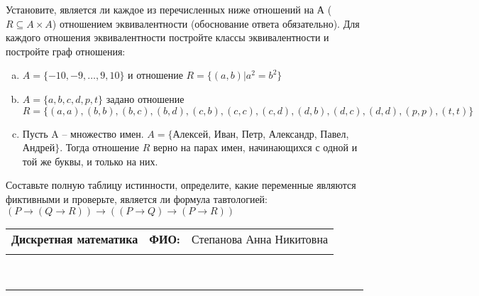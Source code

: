 \documentclass[10pt]{exam}
\newcommand{\class}{Дискретная математика}
\newcommand{\examdate}{}
\begin{document}
\begin{questions}
\question
Установите, является ли каждое из перечисленных ниже отношений на А ($R \subseteq A \times A$) отношением эквивалентности (обоснование ответа обязательно). Для каждого отношения эквивалентности постройте классы 
эквивалентности и постройте граф отношения:
\begin{enumerate} [a)]\setcounter{enumi}{0}
\item $A = \{-10, -9, … , 9, 10\}$ и отношение $R = \{(a,b)|a^{2} = b^{2}\}$
\item $A = \{a, b, c, d, p, t\}$ задано отношение $R = \{(a, a), (b, b), (b, c), (b, d), (c, b), (c, c), (c, d), (d, b), (d, c), (d, d), (p,p), (t,t)\}$
\item Пусть A – множество имен. $A = \{ $Алексей, Иван, Петр, Александр, Павел, Андрей$ \}$. Тогда отношение $R$ верно на парах имен, начинающихся с одной и той же буквы, и только на них.
\end{enumerate}\question Составьте полную таблицу истинности, определите, какие переменные являются фиктивными и проверьте, является ли формула тавтологией:
$(P \rightarrow (Q \rightarrow R)) \rightarrow ((P \rightarrow Q) \rightarrow (P \rightarrow R))$

\end{questions}
\newpage
\begin{flushright}
\begin{tabular}{p{2.8in} r l}
\textbf{\class} & \textbf{ФИО:} &Степанова Анна Никитовна
\\

\textbf{\examdate} &&\\
\end{tabular}\\
\end{flushright}
\rule[1ex]{\textwidth}{.1pt}
\end{document}
